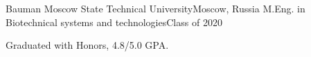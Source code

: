 \resumeSubheading
{Bauman Moscow State Technical University}{Moscow, Russia}
{M.Eng. in Biotechnical systems and technologies}{Class of 2020}
\begin{itemize}[leftmargin=0in, label={}]
    \small{\item{
        {Graduated with Honors, 4.8/5.0 GPA.}\\
    }}
    \end{itemize}